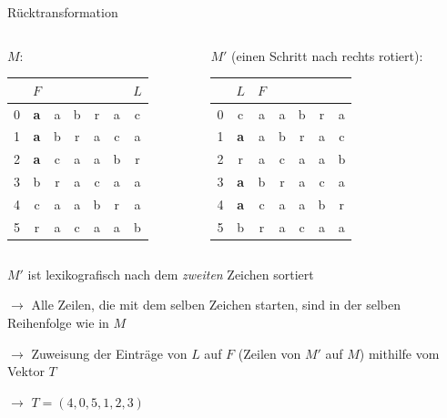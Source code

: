 \documentclass[ngerman,aspectratio=169,10pt]{beamer}
\begin{document}
\begin{frame}{Rücktransformation}
    \begin{columns}
        \begin{column}{0.46\textwidth}
            $M$:\\
            \begin{tabular}{l|c c c c c c}
                &$F$&&&&&$L$\\
                \hline
                0&\textbf{a}&a&b&r&a&c\\
                1&\textbf{a}&b&r&a&c&a\\
                2&\textbf{a}&c&a&a&b&r\\
                3&b&r&a&c&a&a\\
                4&c&a&a&b&r&a\\
                5&r&a&c&a&a&b\\
            \end{tabular}
        \end{column}
        \begin{column}{0.46\textwidth}
            $M'$ (einen Schritt nach rechts rotiert):
            \begin{tabular}{l|c c c c c c}
                &$L$&$F$&&&&\\ \hline
                0&c&a&a&b&r&a\\
                1&\textbf{a}&a&b&r&a&c\\
                2&r&a&c&a&a&b\\
                3&\textbf{a}&b&r&a&c&a\\
                4&\textbf{a}&c&a&a&b&r\\
                5&b&r&a&c&a&a\\
            \end{tabular}
        \end{column}
    \end{columns}
    \pause
    $M'$ ist lexikografisch nach dem \emph{zweiten} Zeichen sortiert
    
    $\longrightarrow$ Alle Zeilen, die mit dem selben Zeichen starten, sind in der selben Reihenfolge wie in $M$
    \pause
    
    $\longrightarrow$ Zuweisung der Einträge von $L$ auf $F$ (Zeilen von $M'$ auf $M$) mithilfe vom Vektor $T$
    \pause
    
    $\longrightarrow$ $T=(4, 0, 5, 1, 2, 3)$
\end{frame}
\end{document}
